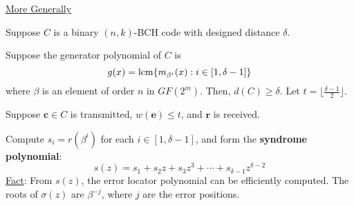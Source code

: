 \underline{More Generally}

Suppose $ C $ is a binary $ (n,k) $-BCH code with designed distance $ \delta $.

Suppose the generator polynomial of $ C $ is
\[ g(x)=\operatorname{lcm} \{m_{\beta^i}(x):i\in[1,\delta-1]\} \]
where $ \beta $ is an element of order $ n $ in $ GF(2^m) $. Then, $ d(C)\geqslant \delta $.
Let $ t=\lfloor \frac{\delta-1}{2} \rfloor $.

Suppose $ \bm{c}\in C $ is transmitted, $ w(\bm{e})\leqslant t $, and $ \bm{r} $
is received.

Compute $ s_i=r(\beta^i) $ for each $ i\in[1,\delta-1] $, and form the
\textbf{syndrome polynomial}:
\[ s(z)=s_1+s_2z+s_3z^3+\cdots+s_{\delta-1}z^{\delta-2} \]
\underline{Fact}: From $ s(z) $, the error locator polynomial
can be efficiently computed. The roots of $ \sigma(z) $
are $ \beta^{-j} $, where $ j $ are the error positions.
